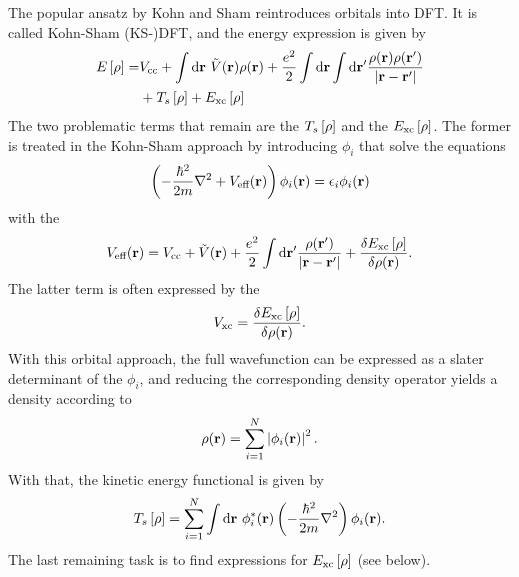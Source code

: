 \documentclass[8.5pt,twoside,twocolumn]{article}
\newcommand\di{\te{d}}
\renewcommand\r{\bo r}
\newcommand\indr{\enmat{\int\di \r}}
\theoremstyle{standard}
\begin{document}
The popular ansatz by Kohn and Sham \cite{KohnSham} reintroduces orbitals into
DFT. It is called Kohn-Sham (KS-)DFT, and the energy expression is given by
\newcommand\er{\ed{\rho}}
\newcommand\exc{E_{\te{xc}}}
\begin{equation}
\begin{aligned}
 E\ed{\rho}=&\vcc+\indr\ \tilde V(\r) \rho(\r) + \frac {e^2}{2}\indr\indr' \frac {\rho(\r)\rho(\r')}{\abs{\r-\r'}}\\
 &+T_s 	\ed{\rho}+\exc\ed{\rho}
\end{aligned}
\label{Theo:EnergyDensityFunctional}
\end{equation}
The two problematic terms that remain are the  $T_s\er$ and the
 $\exc\er$. The former is treated in the Kohn-Sham approach
by  introducing  $\phi_i$ that solve the equations
\newcommand\veff{V_{\te{eff}}}
\newcommand\hm{\frac{\hbar^2}{2m}}
\begin{equation}
\rb{-\frac{\hbar^2}{2m} \nabla^2 + \veff(\r)} \phi_i(\r) = \eps_i \phi_i(\r)
\label{Theo:SCFDFT}
\end{equation}
with the 
\begin{equation}
\veff(\r)=\vcc+ \tilde V(\r) + \frac {e^2}2 \indr'
\frac{\rho(\r')}{\abs{\r-\r'}}+\delti{\exc\er}{\rho(\r)}.
\label{Theo:Veff}
\end{equation}
The latter term is often expressed by the 
\newcommand\vxc{V_{\te{xc}}}
\begin{equation}
\vxc=\delti{\exc\er}{\rho(\r)}.
\label{Theo:Vxc}
\end{equation}
With this orbital approach, the full wavefunction can be expressed as a slater determinant of 
the $\phi_i$, and reducing the corresponding density operator yields a density according to
\begin{equation}
\rho(\r)=\sum_{i=1}^N \abs{\phi_i(\r)}^2.
\label{Theo:RhoByPhi}
\end{equation}
With that, the kinetic energy functional is given by
\begin{equation}
T_s\er=\sum_{i=1}^N \indr\ \phi_i^*(\r) \rb{-\hm \nabla^2} \phi_i(\r).
\end{equation}
The last remaining task is to find expressions for $\exc\er$ (see below).
\end{document}

